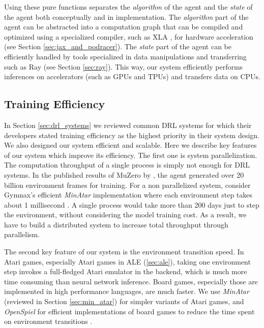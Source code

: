 Using these pure functions separates the \textit{algorithm} of the agent and the \textit{state} of the agent both conceptually and in implementation.
The \textit{algorithm} part of the agent can be abstracted into a computation graph that can be compiled and optimized using a specialized compiler, such as XLA \cite{TensorFlowLargescaleMachine_Abadi.Agarwal.ea_2015}, for hardware acceleration (see Section \ref{sec:jax_and_podracer}).
The \textit{state} part of the agent can be efficiently handled by tools specialized in data manipulations and transferring such as Ray (see Section \ref{sec:ray}).
This way, our system efficiently performs inferences on accelerators (such as GPUs and TPUs) and transfers data on CPUs.

\subsection{Training Efficiency}
In Section \ref{sec:drl_systems} we reviewed common DRL systems for which their developers stated training efficiency as the highest priority in their system design.
We also designed our system efficient and scalable.
Here we describe key features of our system which improve its efficiency.
The first one is system parallelization.
The computation throughput of a single process is simply not enough for DRL systems.
In the published results of MuZero by \cite{MasteringAtariGo_Schrittwieser.Antonoglou.ea_2020}, the agent generated over 20 billion environment frames for training.
For a non parallelized system, consider Gymnax's efficient \textit{MinAtar} implementation where each environment step takes about 1 millisecond \cite{GymnaxJAXbasedReinforcement_RobertTjarkoLange_2022}.
A single process would take more than 200 days just to step the environment, without considering the model training cost.
As a result, we have to build a distributed system to increase total throughput through parallelism.

The second key feature of our system is the environment transition speed.
In Atari games, especially Atari games in ALE (\ref{sec:ale}), taking one environment step invokes a full-fledged Atari emulator in the backend, which is much more time consuming than neural network inference.
Board games, especially those are implemented in high performance languages, are much faster.
We use \textit{MinAtar} (reviewed in Section \ref{sec:min_atar}) for simpler variants of Atari games, and \textit{OpenSpiel} for efficient implementations of board games to reduce the time spent on environment transitions \cite{OpenSpielFrameworkReinforcement_Lanctot.Lockhart.ea_2020,MinAtarAtariInspiredTestbed_Young.Tian_2019}.


